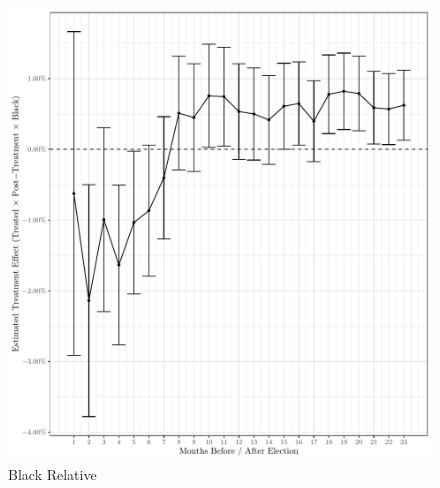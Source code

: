 \documentclass[
  12pt,
]{article}
\begin{document}
\begin{figure}[H]

{\centering \includegraphics{compile_files/figure-latex/black-relative-primary-1} 

}

\caption{\label{fig:did-1}Black Relative}\label{fig:black-relative-primary}
\end{figure}
\end{document}
